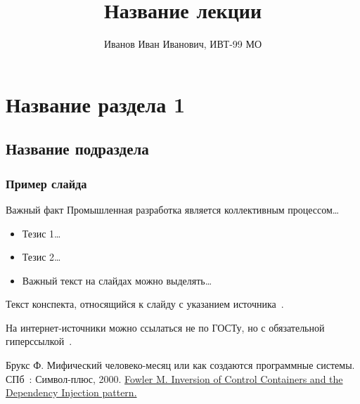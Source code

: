 \documentclass{../industrial-development}
\title{Название лекции}
\author{Иванов Иван Иванович, ИВТ-99 МО}
\date{}
\begin{document}
\begin{frame}
  \titlepage
\end{frame}

\section{Название раздела 1}

\subsection{Название подраздела}

\begin{frame} \frametitle{Пример слайда}
  \begin{block}{Важный факт}
    Промышленная разработка является коллективным процессом\dots
  \end{block}
  
  \begin{itemize}
  \item Тезис 1\dots
  \item Тезис 2\dots
  \item Важный текст на слайдах можно \alert{выделять}\dots
  \end{itemize}
\end{frame}

\lecturenotes

Текст конспекта, относящийся к слайду с указанием источника~\cite[с.~97--99]{Brooks}.

На интернет-источники можно ссылаться не по ГОСТу, но с обязательной гиперссылкой~\cite{Fowler}.

\begin{thebibliography}{99}
 Брукс Ф. Мифический человеко-месяц или как создаются программные системы. СПб~: Символ-плюс, 2000.
 \href{https://martinfowler.com/articles/injection.html}{Fowler M. Inversion of Control Containers and the Dependency Injection pattern.}
\end{thebibliography}
\end{document}
